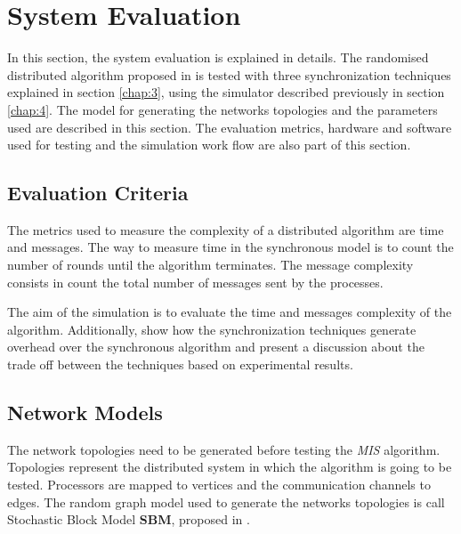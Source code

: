 \section{System Evaluation}
\label{chap:5}

In this section, the system evaluation is explained in details. The randomised distributed algorithm proposed in \cite{yves2009optimal} is tested with three synchronization techniques explained in section \ref{chap:3}, using the simulator described previously in section \ref{chap:4}. The model for generating the networks topologies and the parameters used are described in this section. The evaluation metrics, hardware and software used for testing and the simulation work flow are also part of this section.  


\subsection{Evaluation Criteria}



The metrics used to measure the complexity of a distributed algorithm are time and  messages. The way to measure time in the synchronous model is to count the number of rounds until the algorithm terminates. The message complexity consists in count the total number of messages sent by the processes.

The aim of the simulation is to evaluate the time and messages complexity of the algorithm. Additionally, show how the synchronization techniques generate overhead over the synchronous algorithm and present a discussion about the trade off between the techniques based on experimental results.


\subsection{Network Models}
\label{sec:topology}


The network topologies need to be generated before testing the \textit{MIS} algorithm. Topologies represent the distributed system in which the algorithm is going to be tested. Processors are mapped to vertices and the communication channels to edges.  The random graph model used to generate the networks topologies is call Stochastic Block Model \textbf{SBM}, proposed in \cite{holland1983stochastic}.

